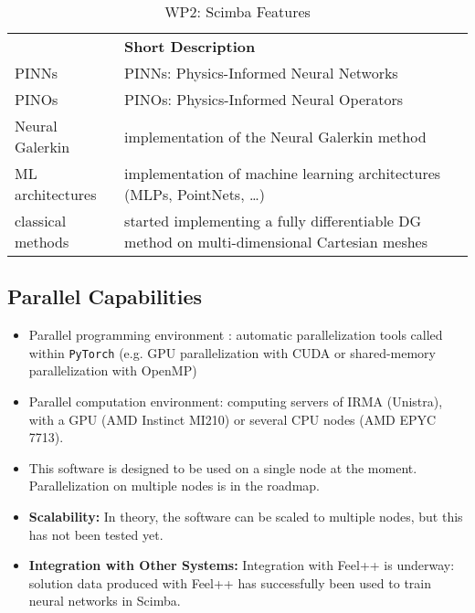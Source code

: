\begin{table}[h!]
    \centering
    {
        \setlength{\parindent}{0pt}
        \def\arraystretch{1.25}
        {
            \fontsize{9}{11}\selectfont
            \begin{tabular}{!{\color{numpexgray}\vrule}p{.25\linewidth}!{\color{numpexgray}\vrule}p{.6885\linewidth}!{\color{numpexgray}\vrule}}
                 & {\rule{0pt}{2.5ex}\color{white}\bf Short Description } \\
                    PINNs
                 & PINNs: Physics-Informed Neural Networks                \\
                    PINOs
                 & PINOs: Physics-Informed Neural Operators               \\
                    Neural Galerkin
                 & implementation of the Neural Galerkin method           \\
                 ML architectures
                 & implementation of machine learning architectures
                (MLPs, PointNets, \dots)                                  \\
                 classical methods
                 & started implementing a fully differentiable
                DG method on multi-dimensional Cartesian meshes           \\
            \end{tabular}
        }
    }
    \caption{WP2: Scimba Features}
    \label{tab:WP2:Scimba:features}
\end{table}


\subsection{Parallel Capabilities}
\label{sec:WP2:Scimba:performances}

\begin{itemize}
    \item Parallel programming environment :
          automatic parallelization tools called within \texttt{PyTorch}
          (e.g. GPU parallelization with CUDA or shared-memory parallelization with OpenMP)
    \item Parallel computation environment: computing servers of IRMA (Unistra),
          with a GPU (AMD Instinct MI210) or several CPU nodes (AMD EPYC 7713).
    \item This software is designed to be used on a single node at the moment.
          Parallelization on multiple nodes is in the roadmap.
    \item \textbf{Scalability:}
          In theory, the software can be scaled to multiple nodes, but this has not been tested yet.
    \item \textbf{Integration with Other Systems:}
          Integration with Feel++ is underway:
          solution data produced with Feel++ has successfully been
          used to train neural networks in Scimba.
\end{itemize}


